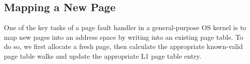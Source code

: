 \subsection{Mapping a New Page}
One of the key tasks of a page fault handler in a general-purpose OS kernel is
to map new pages into an address space by writing into an existing page table.
To do so, we first allocate a fresh page, then calculate the appropriate
known-valid page table walks and update the appropriate L1 page table entry.
\newcommand{\fpaddr}{\texttt{fpaddr}}
\newcommand{\specline}[1]{{\color{blue}\left\{#1\right\}}}
